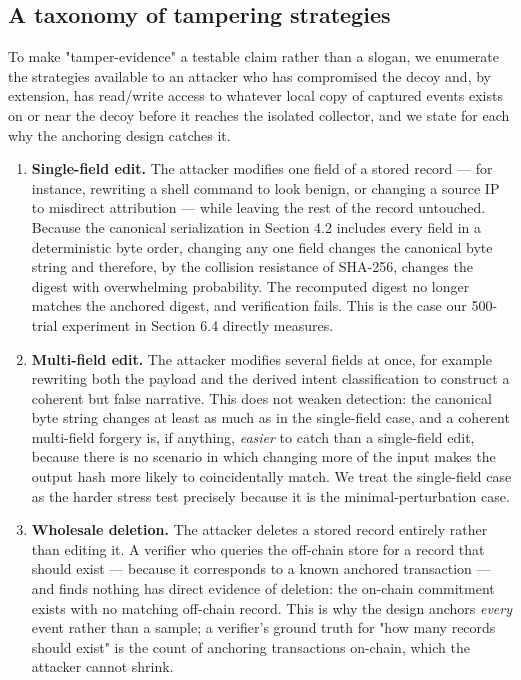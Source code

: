 \documentclass[journal]{IEEEtran}
\begin{document}
\subsection{A taxonomy of tampering strategies}

To make "tamper-evidence" a testable claim rather than a slogan, we enumerate the strategies available to an attacker who has compromised the decoy and, by extension, has read/write access to whatever local copy of captured events exists on or near the decoy before it reaches the isolated collector, and we state for each why the anchoring design catches it.

\begin{enumerate}
\item \textbf{Single-field edit.} The attacker modifies one field of a stored record --- for instance, rewriting a shell command to look benign, or changing a source IP to misdirect attribution --- while leaving the rest of the record untouched. Because the canonical serialization in Section 4.2 includes every field in a deterministic byte order, changing any one field changes the canonical byte string and therefore, by the collision resistance of SHA-256, changes the digest with overwhelming probability. The recomputed digest no longer matches the anchored digest, and verification fails. This is the case our 500-trial experiment in Section 6.4 directly measures.
\item \textbf{Multi-field edit.} The attacker modifies several fields at once, for example rewriting both the payload and the derived intent classification to construct a coherent but false narrative. This does not weaken detection: the canonical byte string changes at least as much as in the single-field case, and a coherent multi-field forgery is, if anything, \emph{easier} to catch than a single-field edit, because there is no scenario in which changing more of the input makes the output hash more likely to coincidentally match. We treat the single-field case as the harder stress test precisely because it is the minimal-perturbation case.
\item \textbf{Wholesale deletion.} The attacker deletes a stored record entirely rather than editing it. A verifier who queries the off-chain store for a record that should exist --- because it corresponds to a known anchored transaction --- and finds nothing has direct evidence of deletion: the on-chain commitment exists with no matching off-chain record. This is why the design anchors \emph{every} event rather than a sample; a verifier's ground truth for "how many records should exist" is the count of anchoring transactions on-chain, which the attacker cannot shrink.

\end{enumerate}
\end{document}
